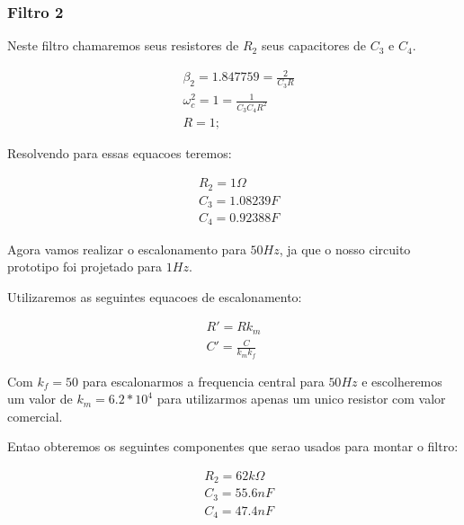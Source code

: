 \documentclass[12pt,twoside, a4paper, twocolumn]{article}
\begin{document}
\subsubsection{Filtro 2}

Neste filtro chamaremos seus resistores de $R_2$ seus capacitores de $C_3$ e $C_4$.

\begin{equation}
    \begin{aligned}
         & \beta_2 = 1.847759 = \frac{2}{C_3 R}   \\
         & \omega_c^2 = 1 = \frac{1}{C_3 C_4 R^2} \\
         & R = 1;
    \end{aligned}
\end{equation}

Resolvendo para essas equacoes teremos:

\begin{equation}
    \begin{aligned}
         & R_2 = 1 \varOmega \\
         & C_3 = 1.08239 F   \\
         & C_4 = 0.92388 F
    \end{aligned}
\end{equation}

Agora vamos realizar o escalonamento para $50Hz$, ja que o nosso circuito prototipo foi projetado para $1Hz$.

Utilizaremos as seguintes equacoes de escalonamento:

\begin{equation}
    \begin{aligned}
        R' = R  k_m \\
        C' = \frac{C}{k_m k_f}
    \end{aligned}
\end{equation}

Com $k_f = 50$ para escalonarmos a frequencia central para $50Hz$ e escolheremos um valor de $k_m = 6.2 * 10^4$ para utilizarmos apenas um unico resistor com valor comercial.

Entao obteremos os seguintes componentes que serao usados para montar o filtro:

\begin{equation}
    \begin{aligned}
         & R_2 = 62k \varOmega \\
         & C_3 = 55.6 nF       \\
         & C_4 = 47.4 nF
    \end{aligned}
\end{equation}
\end{document}
